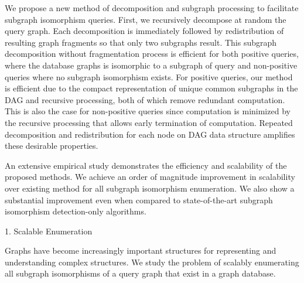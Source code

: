 We propose a new method of decomposition and subgraph processing to facilitate subgraph isomorphism queries. First, we recursively decompose at random  the query graph. Each decomposition is immediately followed by redistribution of resulting graph fragments so that only two subgraphs result. This subgraph decomposition without fragmentation process is efficient for both positive queries, where the database graphs is isomorphic to a subgraph of query and non-positive queries where no subgraph isomorphism exists. For positive queries, our method is efficient due to the compact representation of unique common subgraphs in the DAG  and recursive processing, both of which remove redundant computation. This is also the case for non-positive queries since computation is minimized by the recursive processing that allows early termination of computation. Repeated decomposition and redistribution for each node on DAG data structure amplifies these desirable properties. 


An extensive empirical study demonstrates the efficiency and scalability of the proposed methods. We achieve  an order of magnitude improvement in scalability over existing method for all subgraph isomorphism enumeration.
We also show a substantial improvement even when compared to state-of-the-art subgraph isomorphism detection-only algorithms. 



1. Scalable Enumeration

Graphs have become increasingly important structures for representing and understanding complex structures.
We study the problem of scalably enumerating all subgraph isomorphisms of a query graph that exist in a graph database.

